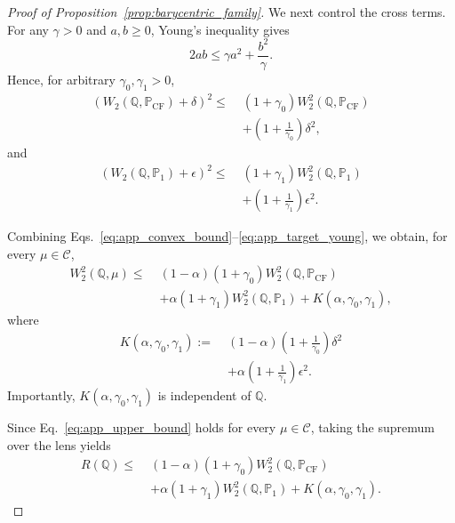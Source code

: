 \begin{proof}[Proof of Proposition~\ref{prop:barycentric_family}]
We next control the cross terms. For any $\gamma>0$ and $a,b\ge 0$,
Young's inequality gives
\begin{equation}
2ab
\le
\gamma a^2+\frac{b^2}{\gamma}.
\label{eq:young}
\end{equation}
Hence, for arbitrary $\gamma_0,\gamma_1>0$,
\begin{align}
\left(
W_2(\mathbb{Q},\mathbb{P}_{\mathrm{CF}})+\delta
\right)^2
\le\;&
(1+\gamma_0)
W_2^2(\mathbb{Q},\mathbb{P}_{\mathrm{CF}})
\nonumber\\
&+
\left(1+\frac{1}{\gamma_0}\right)\delta^2,
\label{eq:app_cf_young}
\end{align}
and
\begin{align}
\left(
W_2(\mathbb{Q},\mathbb{P}_1)+\epsilon
\right)^2
\le\;&
(1+\gamma_1)
W_2^2(\mathbb{Q},\mathbb{P}_1)
\nonumber\\
&+
\left(1+\frac{1}{\gamma_1}\right)\epsilon^2.
\label{eq:app_target_young}
\end{align}

Combining Eqs.~\ref{eq:app_convex_bound}--\ref{eq:app_target_young},
we obtain, for every $\mu\in\mathcal{C}$,
\begin{align}
W_2^2(\mathbb{Q},\mu)
\le\;&
(1-\alpha)(1+\gamma_0)
W_2^2(\mathbb{Q},\mathbb{P}_{\mathrm{CF}})
\nonumber\\
&+
\alpha(1+\gamma_1)
W_2^2(\mathbb{Q},\mathbb{P}_1)
+
K(\alpha,\gamma_0,\gamma_1),
\label{eq:app_upper_bound}
\end{align}
where
\begin{align}
K(\alpha,\gamma_0,\gamma_1)
:=\;&
(1-\alpha)
\left(1+\frac{1}{\gamma_0}\right)\delta^2
\nonumber\\
&+
\alpha
\left(1+\frac{1}{\gamma_1}\right)\epsilon^2.
\label{eq:app_constant}
\end{align}
Importantly, $K(\alpha,\gamma_0,\gamma_1)$ is independent of
$\mathbb{Q}$.

Since Eq.~\ref{eq:app_upper_bound} holds for every
$\mu\in\mathcal{C}$, taking the supremum over the lens yields
\begin{align}
R(\mathbb{Q})
\le\;&
(1-\alpha)(1+\gamma_0)
W_2^2(\mathbb{Q},\mathbb{P}_{\mathrm{CF}})
\nonumber\\
&+
\alpha(1+\gamma_1)
W_2^2(\mathbb{Q},\mathbb{P}_1)
+
K(\alpha,\gamma_0,\gamma_1).
\label{eq:app_robust_bound}
\end{align}


\end{proof}
